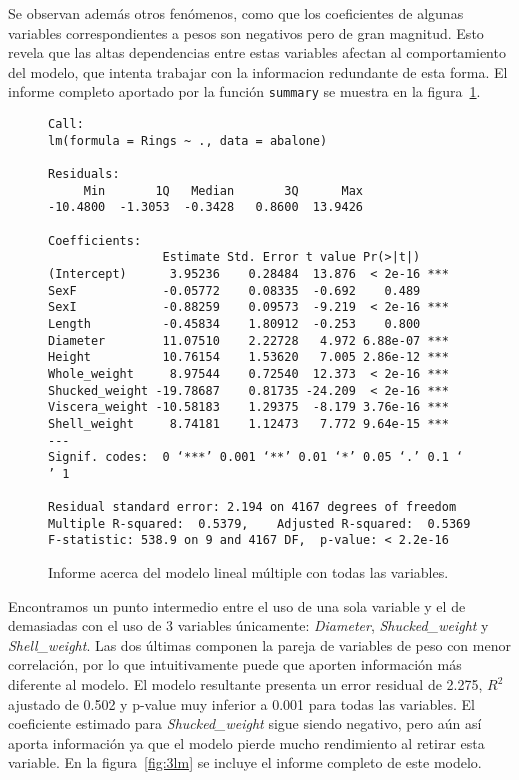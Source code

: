 \documentclass[a4paper, 11pt]{article}
\begin{document}
Se observan además otros fenómenos, como que los coeficientes de algunas variables correspondientes a pesos son negativos pero de gran magnitud. Esto revela que las altas dependencias entre estas variables afectan al comportamiento del modelo, que intenta trabajar con la informacion redundante de esta forma. El informe completo aportado por la función \texttt{summary} se muestra en la figura~\ref{fig:multlm}.

\begin{figure}[ht]
  \begin{Verbatim}[fontsize=\scriptsize]
Call:
lm(formula = Rings ~ ., data = abalone)

Residuals:
     Min       1Q   Median       3Q      Max 
-10.4800  -1.3053  -0.3428   0.8600  13.9426 

Coefficients:
                Estimate Std. Error t value Pr(>|t|)    
(Intercept)      3.95236    0.28484  13.876  < 2e-16 ***
SexF            -0.05772    0.08335  -0.692    0.489    
SexI            -0.88259    0.09573  -9.219  < 2e-16 ***
Length          -0.45834    1.80912  -0.253    0.800    
Diameter        11.07510    2.22728   4.972 6.88e-07 ***
Height          10.76154    1.53620   7.005 2.86e-12 ***
Whole_weight     8.97544    0.72540  12.373  < 2e-16 ***
Shucked_weight -19.78687    0.81735 -24.209  < 2e-16 ***
Viscera_weight -10.58183    1.29375  -8.179 3.76e-16 ***
Shell_weight     8.74181    1.12473   7.772 9.64e-15 ***
---
Signif. codes:  0 ‘***’ 0.001 ‘**’ 0.01 ‘*’ 0.05 ‘.’ 0.1 ‘ ’ 1

Residual standard error: 2.194 on 4167 degrees of freedom
Multiple R-squared:  0.5379,	Adjusted R-squared:  0.5369 
F-statistic: 538.9 on 9 and 4167 DF,  p-value: < 2.2e-16
  \end{Verbatim}
  \caption{\label{fig:multlm}Informe acerca del modelo lineal múltiple con todas las variables.}
  
\end{figure}

Encontramos un punto intermedio entre el uso de una sola variable y el de demasiadas con el uso de 3 variables únicamente: \textit{Diameter}, \textit{Shucked\_weight} y \textit{Shell\_weight}. Las dos últimas componen la pareja de variables de peso con menor correlación, por lo que intuitivamente puede que aporten información más diferente al modelo. El modelo resultante presenta un error residual de 2.275, $R^2$ ajustado de 0.502 y p-value muy inferior a 0.001 para todas las variables. El coeficiente estimado para \textit{Shucked\_weight} sigue siendo negativo, pero aún así aporta información ya que el modelo pierde mucho rendimiento al retirar esta variable. En la figura~\ref{fig:3lm} se incluye el informe completo de este modelo.
\end{document}
